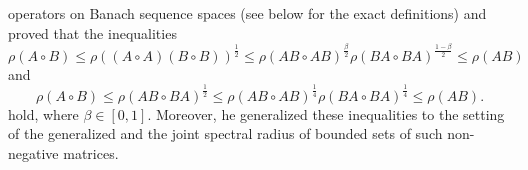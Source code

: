 \documentclass[12pt, reqno]{amsart}
\theoremstyle{definition}
\theoremstyle{remark}
\numberwithin{equation}{section}
\newcommand{\be}{\begin{equation}}
\newcommand{\ee}{\end{equation}}
\begin{document}
operators on Banach sequence spaces (see below for the exact definitions) and proved that the inequalities %
\be
\rho (A\circ B) \le \rho ((A\circ A)(B\circ B))^{\frac{1}{2}}\le \rho(AB \circ AB)^{\frac{\beta}{2}} \rho(BA \circ BA)^{\frac{1-\beta}{2}} \le \rho (AB)
\label{P1}
\ee
and
\be
\rho (A\circ B) \le \rho (AB\circ BA)^{\frac{1}{2}}\le  \rho(AB \circ AB)^{\frac{1}{4}} \rho(BA \circ BA)^{\frac{1}{4}} \le  \rho (AB).
\label{P2}
\ee
hold, where $\beta \in [0,1]$. Moreover, %
 he generalized these inequalities to the setting of the generalized and the joint spectral radius of bounded sets of such non-negative matrices. %

\end{document}
